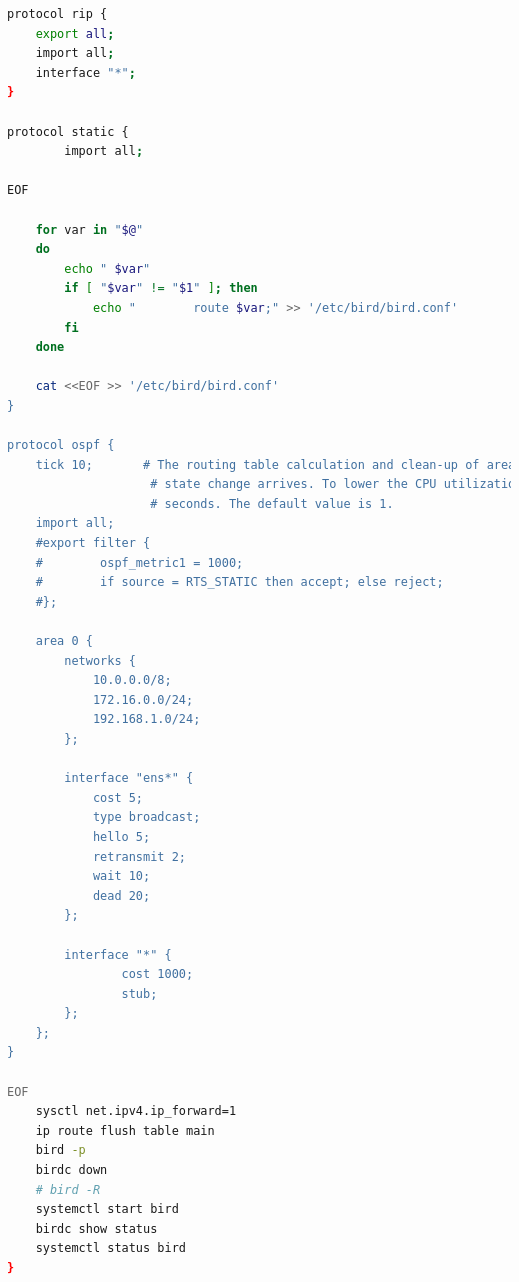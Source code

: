 \documentclass[11pt,titlepage]{article}
\begin{document}
\begin{lstlisting}[language=bash,caption={~/doConfig.sh}]
protocol rip {
    export all;
    import all;
    interface "*";
}

protocol static {
        import all;

EOF
    
    for var in "$@"
    do
        echo " $var"
        if [ "$var" != "$1" ]; then
            echo "        route $var;" >> '/etc/bird/bird.conf'
        fi
    done
    
    cat <<EOF >> '/etc/bird/bird.conf'
}

protocol ospf {
    tick 10;       # The routing table calculation and clean-up of areas' databases is not performed when a single link
                    # state change arrives. To lower the CPU utilization, it's processed later at periodical intervals of num
                    # seconds. The default value is 1.
    import all;
    #export filter {
    #        ospf_metric1 = 1000;
    #        if source = RTS_STATIC then accept; else reject;
    #};

    area 0 {
        networks {
            10.0.0.0/8;
            172.16.0.0/24;
            192.168.1.0/24;
        };
        
        interface "ens*" {
            cost 5;
            type broadcast;
            hello 5; 
            retransmit 2; 
            wait 10; 
            dead 20;
        };

        interface "*" {
                cost 1000;
                stub;
        };
    };
}

EOF
    sysctl net.ipv4.ip_forward=1
    ip route flush table main
    bird -p
    birdc down
    # bird -R
    systemctl start bird
    birdc show status
    systemctl status bird
}


\end{lstlisting}
\end{document}
